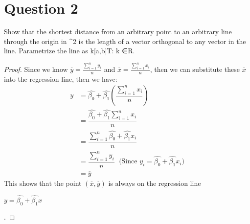 \section{Question 2}

\begin{question}
    Show that the shortest distance from an arbitrary point to an arbitrary line through the origin in ^2 is the length of a vector orthogonal to any vector in the line. Parametrize the line as {k[a,b]T: k ∈R}.
\end{question}

\begin{answer}
    \begin{proof}
        Since we know $\overline{y} = \tfrac{\sum_{i = 1}^{n}{y_i}}{n}$ and $\overline{x} = \tfrac{\sum_{i = 1}^{n}{x_i}}{n}$, then we can substitute these $\overline{x}$ into the regression line, then we have:
        \begin{align}
            y &= \hat{\beta_0} + \hat{\beta_1}\left(\dfrac{\sum_{i = 1}^{n}{x_i}}{n}\right)\\
            & = \dfrac{\hat{\beta_0} + \hat{\beta_1}\sum_{i = 1}^{n}{x_i}}{n}\\
            & = \dfrac{\sum_{i = 1}^{n}{\hat{\beta_0} + \hat{\beta_1}x_i}}{n}\\
            & = \dfrac{\sum_{i = 1}^{n}{y_i}}{n}\; \text{  (Since } y_i = \hat{\beta_0} + \hat{\beta_1}x_i \text{)}\\
            & = \overline{y}
        \end{align}
        This shows that the point $(\overline{x},\overline{y})$ is always on the regression line 
        \begin{center}
            $y = \hat{\beta_0} + \hat{\beta_1}x$
        \end{center}. 
    \end{proof}
\end{answer}
